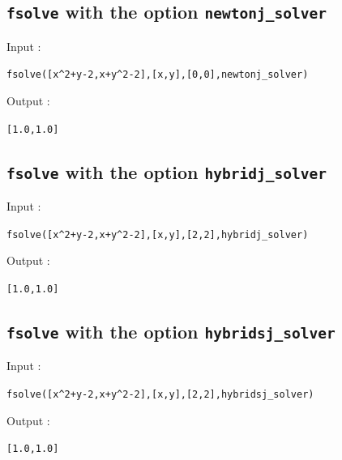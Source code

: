 \documentclass[a4paper,11pt]{book}
\begin{document}
\subsection{{\tt fsolve} with the option {\tt newtonj\_solver}}
\noindent Input :
\begin{center}{\tt fsolve([x\verb|^|2+y-2,x+y\verb|^|2-2],[x,y],[0,0],newtonj\_solver)}\end{center}
Output :
\begin{center}{\tt [1.0,1.0]}\end{center}

\subsection{{\tt fsolve} with the option {\tt hybridj\_solver}}
\noindent Input :
\begin{center}{\tt fsolve([x\verb|^|2+y-2,x+y\verb|^|2-2],[x,y],[2,2],hybridj\_solver)}\end{center}
Output :
\begin{center}{\tt  [1.0,1.0]}\end{center}

\subsection{{\tt fsolve} with the option {\tt hybridsj\_solver}}
\noindent Input :
\begin{center}{\tt fsolve([x\verb|^|2+y-2,x+y\verb|^|2-2],[x,y],[2,2],hybridsj\_solver)}\end{center}
Output :
\begin{center}{\tt  [1.0,1.0]}\end{center}
\end{document}
